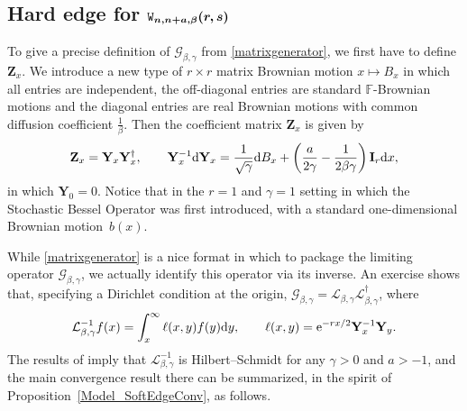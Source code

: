 \documentclass[pdftex]{sigma}
\numberwithin{equation}{section}
\theoremstyle{definition}
\newcommand{\mbf}[1]{\mathbf{#1}}
\begin{document}
\subsection[Hard edge for W\_n, n+a,beta(r,s)]{Hard edge for $\boldsymbol{{\tt{W}}_{n, n+a,\beta}(r,s)}$}

To give a precise definition of
 $\mathcal{G}_{\beta, \gamma}$ from \eqref{matrixgenerator}, we first have to define $\mbf{Z}_x$. We introduce a new type of $r \times r$ matrix
Brownian motion $x \mapsto B_x$ in which all entries are independent, the off-diagonal entries are standard ${\mathbb{F}}$-Brownian motions and the diagonal entries are real Brownian motions with common diffusion coefficient $\frac{1}{\beta}$. Then the coefficient matrix $\mbf{Z}_x$
is given by
\begin{equation}
\label{WandA}
 \mbf{Z}_x = \mbf{Y}_x \mbf{Y}_x^{\dagger}, \qquad
 \mbf{Y}_x^{-1} {\rm d} \mbf{Y}_x = \frac{1}{\sqrt{\gamma}}{\rm d}B_x +
 \left( \frac{a}{2 \gamma} - \frac{1}{2\beta \gamma} \right) \mbf{I}_r {\rm d}x,
\end{equation}
in which $\mbf{Y}_0 = 0.$ Notice that in the $r=1$ and $\gamma =1$ setting in which
the Stochastic Bessel Operator was first introduced,  with a standard one-dimensional Brownian motion~$b(x)$.

While \eqref{matrixgenerator} is a nice format in which to package the limiting operator $\mathcal{G}_{\beta, \gamma}$, we actually identify this operator via its inverse. An exercise shows that, specifying a Dirichlet condition at the origin, $\mathcal{G}_{\beta, \gamma} = \mathcal{L}_{\beta, \gamma} \mathcal{L}_{\beta, \gamma}^{\dagger} $,
where
\begin{equation*}
\label{kernel_ops}
 \mathcal{L}_{\beta, \gamma}^{-1} f (x) = \int_x^\infty {\ell}(x,y) f(y) {\rm d}y, \qquad {\ell}(x,y) = {\rm e}^{-rx/2} \mbf{Y}_x^{-1} \mbf{Y}_y.
\end{equation*}
The results of \cite{RR2} imply that $\mathcal{L}_{\beta, \gamma}^{-1}$ is Hilbert--Schmidt for any $\gamma >0$ and $a>-1$, and the main convergence result there can be summarized, in the spirit of Proposition~\ref{Model_SoftEdgeConv}, as follows.
\end{document}
